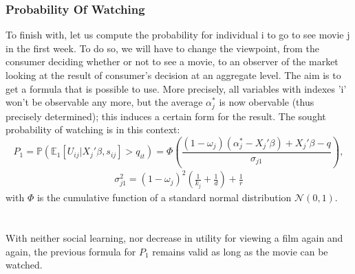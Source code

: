 	\subsubsection{Probability Of Watching}
	To finish with, let us compute the probability for individual i to go to see movie j in the first week. To do so, we will have to change the viewpoint, from the consumer deciding whether or not to see a movie, to an observer of the market looking at the result of consumer's decision at an aggregate level. The aim is to get a formula that is possible to use. More precisely, all variables with indexes 'i' won't be observable any more, but the average $\alpha_{j}^{*}$ is now obervable (thus precisely determined); this induces a certain form for the result. The sought probability of watching is in this context:
	\begin{equation} \label{eq:4}
	P_{1}=\mathbb{P}(\mathbb{E}_1[U_{i j}|X_{j}'\beta, s_{i j}]>q_{i t})=\Phi\left(\frac{(1-\omega_{j})(\alpha_{j}^{*}-X_{j}'\beta)+X_{j}'\beta-q}{\sigma_{j 1}}\right),
	\end{equation}
	\begin{align*}
	\sigma_{j 1}^{2}=(1-\omega_{j})^{2}\left(\frac{1}{k_{j}}+\frac{1}{d}\right)+\frac{1}{r}
	\end{align*}
	with $\Phi$ is the cumulative function of a standard normal distribution $\mathcal{N}(0,1)$.\\
	\\
	\\
	With neither social learning, nor decrease in utility for viewing a film again and again, the previous formula for $P_{1}$ remains valid as long as the movie can be watched.\\
	

